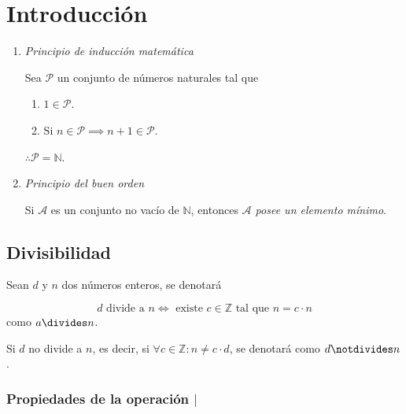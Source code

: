 \chapter{Introducción} %

\begin{enumerate}[font={\bfseries},label={\roman*.}]

\item\label{pr:1} \emph{Principio de inducción matemática}
	
Sea $\mathcal{P}$ un conjunto de números naturales tal que

\begin{enumerate}
	\item $1\in\mathcal{P}$.
	\item Si $n\in\mathcal{P}\implies n+1\in\mathcal{P}$.
\end{enumerate}

$\therefore \boxed{\mathcal{P}=\mathbb{N}}$.

\item\label{pr:2} \emph{Principio del buen orden}

Si $\mathcal{A}$ es un conjunto no vacío de $\mathbb{N}$, entonces \emph{$\mathcal{A}$ posee un elemento mínimo}.

\end{enumerate}

\section{Divisibilidad}

\begin{definition}\label{def:1.1}

Sean $d$ y $n$ dos números enteros, se denotará

\[\boxed{d\text{ divide a }n\iff\text{ existe }c\in\mathbb{Z}\text{ tal que }n=c\cdot n}\]
como $a\divides n$.

\noindent
Si $d$ no divide a $n$, es decir, si $\forall c\in\mathbb{Z}\colon n\neq c\cdot d$, se denotará como $d\notdivides n$.

\end{definition}

\subsection{Propiedades de la operación $|$}

